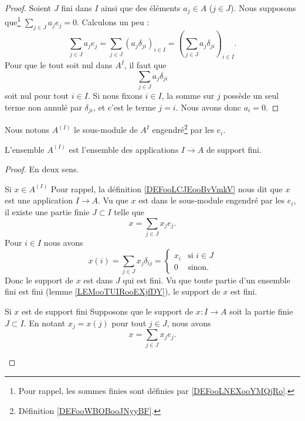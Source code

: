 \begin{proof}
    Soient \( J\) fini dans \( I\) ainsi que des éléments \( a_j\in A\) (\( j\in J\)). Nous supposons que\footnote{Pour rappel, les sommes finies sont définies par \ref{DEFooLNEXooYMQjRo}.} \( \sum_{j\in J}a_je_j=0\). Calculons un peu :
    \begin{equation}
        \sum_{j\in J}a_je_j=\sum_{j\in J}(a_j\delta_{ji})_{i\in I}=\left( \sum_{j\in J}a_j\delta_{ji} \right)_{i\in I}.
    \end{equation}
    Pour que le tout soit nul dans \( A^I\), il faut que
    \begin{equation}
        \sum_{j\in J}a_j\delta_{ji}
    \end{equation}
    soit nul pour tout \( i\in I\). Si nous fixons \( i\in I\), la somme sur \( j\) possède un seul terme non annulé par \( \delta_{ji}\), et c'est le terme \( j=i\). Nous avons donc \( a_i=0\).
\end{proof}

\begin{definition}      \label{DEFooBMEPooFsCHgb}
    Nous notons \( A^{(I)}\) le sous-module de \( A^I\) engendré\footnote{Définition \ref{DEFooWBOBooJNyyBF}.} par les \( e_i\).
\end{definition}

\begin{lemma}
    L'ensemble \( A^{(I)}\) est l'ensemble des applications \( I\to A\) de support fini.
\end{lemma}

\begin{proof}
    En deux sens.
    \begin{subproof}
    \item[Si \( x\in A^{(I)}\)]
        Pour rappel, la définition \ref{DEFooLCJEooBvVmkV} nous dit que \( x\) est une application \( I\to A\). Vu que \( x\) est dans le sous-module engendré par les \( e_i\), il existe une partie finie \( J\subset I\) telle que
        \begin{equation}
            x=\sum_{j\in J}x_je_j.
        \end{equation}
        Pour \( i\in I\) nous avons
        \begin{equation}
            x(i)=\sum_{j\in J}x_j\delta_{ij}=\begin{cases}
                x_i    &   \text{si } i\in J\\
                0    &    \text{sinon. }
            \end{cases}
        \end{equation}
        Donc le support de \( x\) est dans \( J\) qui est fini. Vu que toute partie d'un ensemble fini est fini (lemme \ref{LEMooTUIRooEXjfDY}), le support de \( x\) est fini.
    \item[Si \( x\) est de support fini]
        Supposons que le support de \( x\colon I\to A\) soit la partie finie \( J\subset I\). En notant \( x_j=x(j)\) pour tout \( j\in J\), nous avons
        \begin{equation}
            x=\sum_{j\in J}x_je_j.
        \end{equation}
    \end{subproof}
\end{proof}

